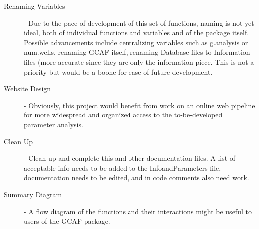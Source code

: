 \documentclass[11pt]{article}
\newcommand{\inlex}[1]{\ttfamily\small{#1}\rmfamily}
\begin{document}
\begin{spacing}{.1}
\begin{description}
\item[Renaming Variables] - Due to the pace of development of this set of functions, naming is not yet ideal, both of individual functions and variables and of the package itself. Possible advancements include centralizing variables such as \inlex{g.analysis} or \inlex{num.wells}, renaming GCAF itself, renaming Database files to Information files (more accurate since they are only the information piece. This is not a priority but would be a boone for ease of future development. 

\item [Website Design] - Obviously, this project would benefit from work on an online web pipeline for more widespread and organized access to the to-be-developed parameter analysis.

\item[Clean Up] - Clean up and complete this and other documentation files. A list of acceptable info needs to be added to the InfoandParameters file, documentation needs to be edited, and in code comments also need work.

\item[Summary Diagram] - A flow diagram of the functions and their interactions might be useful to users of the GCAF package.

\end{description}
\end{spacing}
\end{document}
